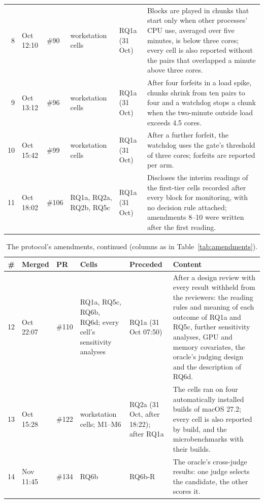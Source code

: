 \documentclass{article}
\begin{document}
\begin{table}[ht]
\begin{tabular}{r>{\raggedright\arraybackslash}p{1.95cm}>{\raggedright\arraybackslash}p{1.1cm}>{\raggedright\arraybackslash}p{2.0cm}>{\raggedright\arraybackslash}p{2.1cm}>{\raggedright\arraybackslash}p{6.85cm}}
8 & 15 Oct 12:10 & \#90 & workstation cells & RQ1a (31 Oct) & Blocks are played in chunks that start only when other processes' CPU use, averaged over five minutes, is below three cores; every cell is also reported without the pairs that overlapped a minute above three cores. \\
9 & 16 Oct 13:12 & \#96 & workstation cells & RQ1a (31 Oct) & After four forfeits in a load spike, chunks shrink from ten pairs to four and a watchdog stops a chunk when the two-minute outside load exceeds 4.5 cores. \\
10 & 26 Oct 15:42 & \#99 & workstation cells & RQ1a (31 Oct) & After a further forfeit, the watchdog uses the gate's threshold of three cores; forfeits are reported per arm. \\
11 & 27 Oct 18:02 & \#106 & RQ1a, RQ2a, RQ2b, RQ5c & RQ1a (31 Oct) & Discloses the interim readings of the first-tier cells recorded after every block for monitoring, with no decision rule attached; amendments 8--10 were written after the first reading. \\
\bottomrule
\end{tabular}
\end{table}
\begin{table}[ht]
\centering
\caption{The protocol's amendments, continued (columns as in Table~\ref{tab:amendments}).}
\label{tab:amendments-b}
\footnotesize
\setlength{\tabcolsep}{3pt}
\begin{tabular}{r>{\raggedright\arraybackslash}p{1.95cm}>{\raggedright\arraybackslash}p{1.1cm}>{\raggedright\arraybackslash}p{2.0cm}>{\raggedright\arraybackslash}p{2.1cm}>{\raggedright\arraybackslash}p{6.85cm}}
\toprule
\# & Merged & PR & Cells & Preceded & Content \\
\midrule
12 & 27 Oct 22:07 & \#110 & RQ1a, RQ5c, RQ6b, RQ6d; every cell's sensitivity analyses & RQ1a (31 Oct 07:50) & After a design review with every result withheld from the reviewers: the reading rules and meaning of each outcome of RQ1a and RQ5c, further sensitivity analyses, GPU and memory covariates, the oracle's judging design and the description of RQ6d. \\
13 & 31 Oct 15:28 & \#122 & workstation cells; M1--M6 & RQ2a (31 Oct, after 18:22); after RQ1a & The cells ran on four automatically installed builds of macOS 27.2; every cell is also reported by build, and the microbenchmarks with their builds. \\
14 & 1 Nov 11:45 & \#134 & RQ6b & RQ6b-R & The oracle's cross-judge results: one judge selects the candidate, the other scores it. \\
\bottomrule
\end{tabular}
\end{table}
\end{document}
